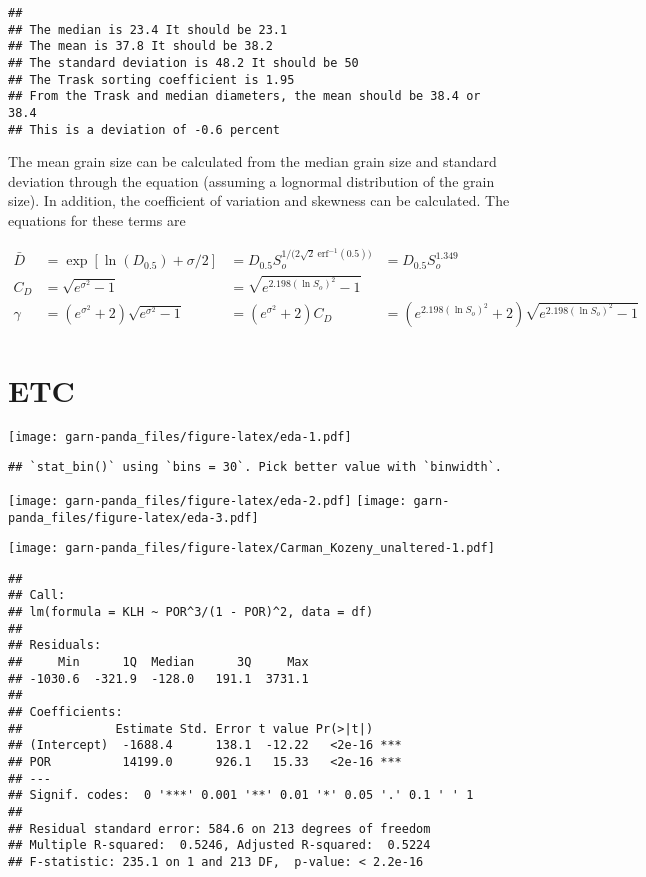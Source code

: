 \documentclass[]{article}
\begin{document}
\begin{verbatim}
## 
## The median is 23.4 It should be 23.1 
## The mean is 37.8 It should be 38.2 
## The standard deviation is 48.2 It should be 50 
## The Trask sorting coefficient is 1.95 
## From the Trask and median diameters, the mean should be 38.4 or 38.4 
## This is a deviation of -0.6 percent
\end{verbatim}

The mean grain size can be calculated from the median grain size and
standard deviation through the equation (assuming a lognormal
distribution of the grain size). In addition, the coefficient of
variation and skewness can be calculated. The equations for these terms
are

\begin{align}
\bar{D} &= \exp \left[ \ln(D_{\text{0.5}}) + \sigma/2 \right] 
        &= D_{0.5} S_o^{1/{(2\sqrt{2}\ \text{erf}^{-1}(0.5)})} 
        &= D_{0.5} S_o^{1.349}\\
C_D &= \sqrt{e^{\sigma^2}-1} 
    &= \sqrt{e^{2.198(\ln S_o)^2} -1} & \\
\gamma &= \left(e^{\sigma^2} + 2\right) \sqrt{e^{\sigma^2}-1} 
       &= \left(e^{\sigma^2} + 2\right) C_D 
       &= \left( e^{2.198(\ln S_o)^2} + 2\right)\sqrt{e^{2.198(\ln S_o)^2} -1}
\end{align}

\section{ETC}\label{etc}

\texttt{[image: garn-panda\_files/figure-latex/eda-1.pdf]}

\begin{verbatim}
## `stat_bin()` using `bins = 30`. Pick better value with `binwidth`.
\end{verbatim}

\texttt{[image: garn-panda\_files/figure-latex/eda-2.pdf]}
\texttt{[image: garn-panda\_files/figure-latex/eda-3.pdf]}

\texttt{[image: garn-panda\_files/figure-latex/Carman\_Kozeny\_unaltered-1.pdf]}

\begin{verbatim}
## 
## Call:
## lm(formula = KLH ~ POR^3/(1 - POR)^2, data = df)
## 
## Residuals:
##     Min      1Q  Median      3Q     Max 
## -1030.6  -321.9  -128.0   191.1  3731.1 
## 
## Coefficients:
##             Estimate Std. Error t value Pr(>|t|)    
## (Intercept)  -1688.4      138.1  -12.22   <2e-16 ***
## POR          14199.0      926.1   15.33   <2e-16 ***
## ---
## Signif. codes:  0 '***' 0.001 '**' 0.01 '*' 0.05 '.' 0.1 ' ' 1
## 
## Residual standard error: 584.6 on 213 degrees of freedom
## Multiple R-squared:  0.5246, Adjusted R-squared:  0.5224 
## F-statistic: 235.1 on 1 and 213 DF,  p-value: < 2.2e-16
\end{verbatim}
\end{document}
